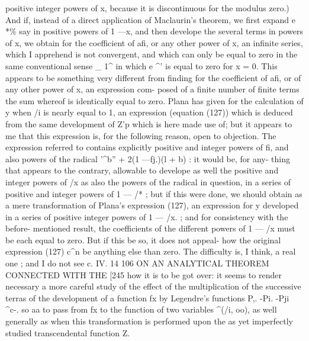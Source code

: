 \documentclass[11pt,a4paper]{book}
\begin{document}
positive  integer  powers  of  x,  because  it   is  discontinuous  for  the  modulus  zero.)    And  if,
instead
of
a
direct
application
of
Maclaurin's
theorem,
we
first
expand
e
*\%
say
in
positive
powers
of
1  —x,
and
then
develope
the
several
terms
in
powers
of
x,
we
obtain
for
the
coefficient
of
afi,
or
any
other
power
of
x,
an
infinite
series,
which
I  apprehend
is  not  convergent,  and  which   can  only  be  equal   to  zero  in  the  same  conventional  sense
_  1^
in  which  e  ^'  is   equal   to   zero   for  x  =  0.     This  appears   to   be   something  very  different
from   finding   for  the   coefficient  of  afi,  or  of  any  other  power   of  x,  an   expression  com-
posed of  a  finite  number  of  finite  terms  the  sum  whereof  is  identically  equal  to  zero.
Plana  has  given  for  the  calculation  of  y  when  /i  is  nearly  equal  to  1,  an  expression
(equation  (127))  which  is  deduced  from  the  same  development  of  Z'p  which  is  here
made  use  of;  but  it  appears  to  me  that  this  expression  is,  for  the  following  reason,
open  to  objection.  The  expression  referred  to  contains  explicitly  positive  and  integer
powers  of  fi,  and  also  powers  of  the  radical  '^b'' +  2(1 —fj.)(l +  b)  :  it  would  be,  for  any-
thing that  appears  to  the  contrary,  allowable  to  develope  as  well  the  positive  and
integer  powers  of  /x  as  also  the  powers  of  the  radical  in  question,  in  a  series  of
positive  and  integer  powers  of  1  —  /* ;  but  if  this  were  done,  we  should  obtain  as
a  mere  transformation  of  Plana's  expression  (127),  an  expression  for  y  developed  in  a
series  of  positive  integer  powers  of  1  —  /x. ;  and  for  consistency  with  the  before-
mentioned  result,  the  coefficients  of  the  different  powers  of  1  —  /x  must  be  each  equal
to  zero.  But  if  this  be  so,  it  does  not  appeal-  how  the  original  expression  (127)  c^n
be  anything  else  than  zero.  The  difficulty  is,  I  think,  a  real  one ;  and  I  do  not  see
c.  IV.  14
106  ON   AN   ANALYTICAL   THEOREM   CONNECTED   WITH   THE  [245
how  it  is  to  be  got  over:  it  seems  to  render  necessary  a  more  careful  study  of  the
effect  of  the  multiplication  of  the  successive  terras  of  the  development  of  a  function
fx  by  Legendre's  functions  P,.  -Pi.  -Pji  ^c-.  so  aa  to  pass  from  fx  to  the  function  of
two  variables  ^(/i,  oo),  as  well  generally  as  when  this  transformation  is  performed  upon
the  as  yet  imperfectly  studied  transcendental  function  Z.
\end{document}
